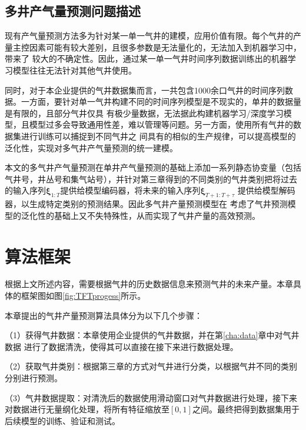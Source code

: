     
\subsection{多井产气量预测问题描述}
现有产气量预测方法多为针对某一单一气井的建模，应用价值有限。每个气井的产量主控因素可能有较大差别，且很多参数是无法量化的，无法加入到机器学习中，带来了
较大的不确定性。因此，通过某一单一气井时间序列数据训练出的机器学习模型往往无法针对其他气井使用。

同时，对于本企业提供的气井数据集而言，一共包含1000余口气井的时间序列数据。一方面，要针对单一气井构建不同的时间序列模型是不现实的，单井的数据量是有限的，且部分气井仅具
有极少量数据，无法据此构建机器学习/深度学习模型，且模型过多会导致通用性差，难以管理等问题。另一方面，使用所有气井的数据集进行训练可以捕捉到不同气井之
间具有的相似的生产规律，可以提高模型的泛化性，实现对多气井产气量预测的统一建模。

本文的多气井产气量预测在单井产气量预测的基础上添加一系列静态协变量（包括气井号，井丛号和集气站号），并针对第三章得到的不同类别的气井类别把将过去的输入序列$\bm{\xi}_{1:T}$提供给模型编码器，将未来的输入序列$\bm{\xi}_{T+1:T+\tau}$
提供给模型解码器，以生成特定类别的预测结果。因此多气井产量预测模型在
考虑了气井预测模型的泛化性的基础上又不失特殊性，从而实现了气井产量的高效预测。
\section{算法框架}
根据上文所述内容，需要根据气井的历史数据信息来预测气井的未来产量。本章具体的框架图如图\ref{fig:TFTprogess}所示。

本章提出的气井产量预测算法具体分为以下几个步骤：

（1）获得气井数据：本章使用企业提供的气井数据，并在第\ref{cha:data}章中对气井数据
进行了数据清洗，使得其可以直接在接下来进行数据处理。

（2）获取气井类别：根据第三章的方式对气井进行分类，以根据气井不同的类别分别进行预测。

（3）气井数据提取：对清洗后的数据使用滑动窗口对气井数据进行处理，接下来对数据进行无量纲化处理，将所有特征缩放至$[0,1]$之间。最终把得到数据集用于后续模型的训练、验证和测试。

